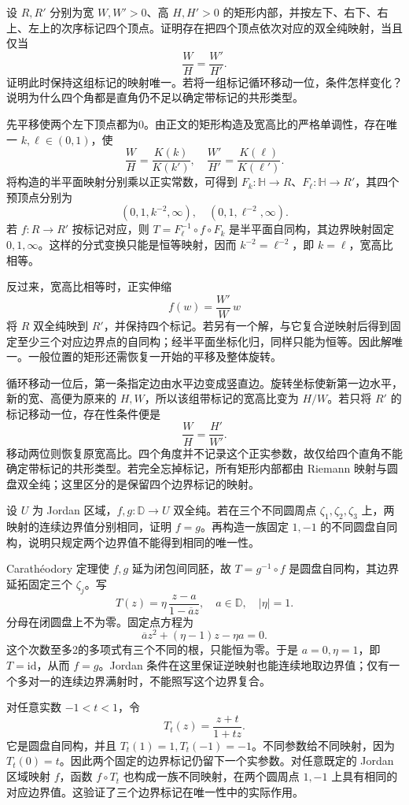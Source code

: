 \begin{exercise}\label{b3:ex:07-7}
设 \(R,R'\) 分别为宽 \(W,W'>0\)、高 \(H,H'>0\) 的矩形内部，并按左下、右下、右上、左上的次序标记四个顶点。证明存在把四个顶点依次对应的双全纯映射，当且仅当
\[
 \frac WH=\frac{W'}{H'}.
\]
证明此时保持这组标记的映射唯一。若将一组标记循环移动一位，条件怎样变化？说明为什么四个角都是直角仍不足以确定带标记的共形类型。
\end{exercise}
\begin{solution}
先平移使两个左下顶点都为0。由正文的矩形构造及宽高比的严格单调性，存在唯一 \(k,\ell\in(0,1)\)，使
\[
 \frac WH=\frac{K(k)}{K(k')},\quad
 \frac{W'}{H'}=\frac{K(\ell)}{K(\ell')}.
\]
将构造的半平面映射分别乘以正实常数，可得到
\(F_k:\mathbb H\to R\)、\(F_\ell:\mathbb H\to R'\)，其四个预顶点分别为
\[
 (0,1,k^{-2},\infty),\quad
 (0,1,\ell^{-2},\infty).
\]
若 \(f:R\to R'\) 按标记对应，则
\(T=F_\ell^{-1}\circ f\circ F_k\) 是半平面自同构，其边界映射固定 \(0,1,\infty\)。这样的分式变换只能是恒等映射，因而
\(k^{-2}=\ell^{-2}\)，即 \(k=\ell\)，宽高比相等。

反过来，宽高比相等时，正实伸缩
\[
 f(w)=\frac{W'}W\,w
\]
将 \(R\) 双全纯映到 \(R'\)，并保持四个标记。若另有一个解，与它复合逆映射后得到固定至少三个对应边界点的自同构；经半平面坐标化归，同样只能为恒等。因此解唯一。一般位置的矩形还需恢复一开始的平移及整体旋转。

循环移动一位后，第一条指定边由水平边变成竖直边。旋转坐标使新第一边水平，新的宽、高便为原来的 \(H,W\)，所以该组带标记的宽高比变为 \(H/W\)。若只将 \(R'\) 的标记移动一位，存在性条件便是
\[
 \frac WH=\frac{H'}{W'}.
\]
移动两位则恢复原宽高比。四个角度并不记录这个正实参数，故仅给四个直角不能确定带标记的共形类型。若完全忘掉标记，所有矩形内部都由 Riemann 映射与圆盘双全纯；这里区分的是保留四个边界标记的映射。
\end{solution}

\begin{exercise}\label{b3:ex:07-8}
设 \(U\) 为 Jordan 区域，\(f,g:\mathbb D\to U\) 双全纯。若在三个不同圆周点 \(\zeta_1,\zeta_2,\zeta_3\) 上，两映射的连续边界值分别相同，证明 \(f=g\)。再构造一族固定 \(1,-1\) 的不同圆盘自同构，说明只规定两个边界值不能得到相同的唯一性。
\end{exercise}
\begin{solution}
Carathéodory 定理使 \(f,g\) 延为闭包间同胚，故 \(T=g^{-1}\circ f\) 是圆盘自同构，其边界延拓固定三个 \(\zeta_j\)。写
\[
 T(z)=\eta\,\frac{z-a}{1-\overline a z},
 \quad a\in\mathbb D,\quad |\eta|=1.
\]
分母在闭圆盘上不为零。固定点方程为
\[
 \overline a z^2+(\eta-1)z-\eta a=0.
\]
这个次数至多2的多项式有三个不同的根，只能恒为零。于是 \(a=0,\eta=1\)，即 \(T=\mathrm{id}\)，从而 \(f=g\)。Jordan 条件在这里保证逆映射也能连续地取边界值；仅有一个多对一的连续边界满射时，不能照写这个边界复合。

对任意实数 \(-1<t<1\)，令
\[
 T_t(z)=\frac{z+t}{1+tz}.
\]
它是圆盘自同构，并且 \(T_t(1)=1,T_t(-1)=-1\)。不同参数给不同映射，因为 \(T_t(0)=t\)。因此两个固定的边界标记仍留下一个实参数。对任意既定的 Jordan 区域映射 \(f\)，函数 \(f\circ T_t\) 也构成一族不同映射，在两个圆周点 \(1,-1\) 上具有相同的对应边界值。这验证了三个边界标记在唯一性中的实际作用。
\end{solution}
